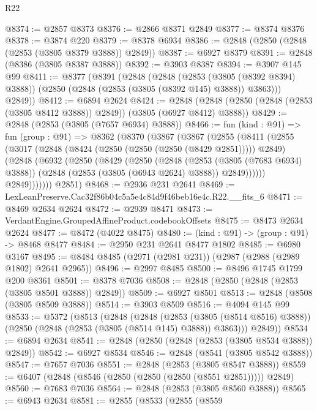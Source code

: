 \begin{lexlean}{R22}
\begin{coremodule}
@8374 := @2857 @8373
@8376 := @2866 @8371 @2849
@8377 := @8374 @8376
@8378 := @3874 @220
@8379 := @8378 @6934
@8386 := @2848 (@2850 (@2848 (@2853 (@3805 @8379 @3888)) @2849))
@8387 := @6927 @8379
@8391 := @2848 (@8386 (@3805 @8387 @3888))
@8392 := @3903 @8387
@8394 := @3907 @145 @99
@8411 := @8377
    (@8391
      (@2848
        (@2848
          (@2853 (@3805 (@8392 @8394) @3888))
          (@2850 (@2848 (@2853 (@3805 (@8392 @145) @3888)) @3863)))
        @2849))
@8412 := @6894 @2624
@8424 := @2848 (@2848 (@2850 (@2848 (@2853 (@3805 @8412 @3888)) @2849)) (@3805 (@6927 @8412) @3888))
@8429 := @2848 (@2853 (@3805 (@7657 @6934) @3888))
@8466 := fun (kind : @91) =>
  fun (group : @91) =>
  @8362
    (@8370
      (@3867
        (@3867
          (@2855
            (@8411
              (@2855
                (@3017
                  (@2848 (@8424 (@2850 (@2850 (@2850 (@8429 @2851))))) @2849)
                  (@2848
                    (@6932
                      (@2850
                        (@8429
                          (@2850
                            (@2848
                              (@2853 (@3805 (@7683 @6934) @3888))
                              (@2848 (@2853 (@3805 (@6943 @2624) @3888)) @2849))))))
                    @2849)))))))
      @2851)
@8468 := @2936 @231 @2641
@8469 := LexLeanPreserve.Cac32f86b04c5a5e4c84d9f46beb16e4c.R22.__fits_6
@8471 := @8469 @2634 @2624
@8472 := @2939 @8471
@8473 := VerdantEngine.GroupedAffineProduct.codebookOffsets
@8475 := @8473 @2634 @2624
@8477 := @8472 (@4022 @8475)
@8480 := (kind : @91) -> (group : @91) -> @8468 @8477
@8484 := @2950 @231 @2641 @8477 @1802
@8485 := @6980 @3167
@8495 := @8484 @8485 (@2971 (@2981 @231)) (@2987 (@2988 (@2989 @1802) @2641 @2965))
@8496 := @2997 @8485
@8500 := @8496 @1745 @1799 @200 @8361
@8501 := @8378 @7036
@8508 := @2848 (@2850 (@2848 (@2853 (@3805 @8501 @3888)) @2849))
@8509 := @6927 @8501
@8513 := @2848 (@8508 (@3805 @8509 @3888))
@8514 := @3903 @8509
@8516 := @4094 @145 @99
@8533 := @5372
    (@8513
      (@2848
        (@2848
          (@2853 (@3805 (@8514 @8516) @3888))
          (@2850 (@2848 (@2853 (@3805 (@8514 @145) @3888)) @3863)))
        @2849))
@8534 := @6894 @2634
@8541 := @2848 (@2850 (@2848 (@2853 (@3805 @8534 @3888)) @2849))
@8542 := @6927 @8534
@8546 := @2848 (@8541 (@3805 @8542 @3888))
@8547 := @7657 @7036
@8551 := @2848 (@2853 (@3805 @8547 @3888))
@8559 := @6407 (@2848 (@8546 (@2850 (@2850 (@2850 (@8551 @2851))))) @2849)
@8560 := @7683 @7036
@8564 := @2848 (@2853 (@3805 @8560 @3888))
@8565 := @6943 @2634
@8581 := @2855
    (@8533
      (@2855
        (@8559

\end{coremodule}
\end{lexlean}
